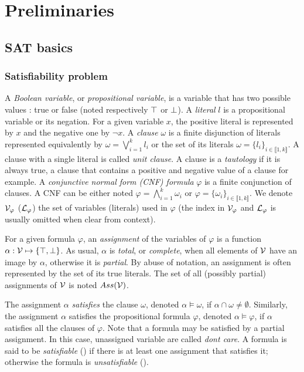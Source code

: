 \chapter{Preliminaries}\label{chap:preliminaries}

\section{SAT basics}

\subsection{Satisfiability problem}
A \emph{Boolean variable}, or \emph{propositional variable}, is a variable that
has two possible values : true or false (noted respectively $\top$ or $\bot$).
A \emph{literal} $l$ is a propositional variable or its
negation. For a given variable $x$, the positive literal is represented by $x$
and the negative one by $\neg x$.
A \emph{clause} $\omega$ is a finite disjunction of literals represented
equivalently by $\omega = \bigvee_{i=1}^k l_i$ or the set of its literals
$\omega = \{l_i\}_{i \in \llbracket 1,k \rrbracket}$. A clause with a single
literal is called \emph{unit clause}.
A clause is a \emph{tautology} if it is always true, a clause that contains a positive 
and negative value of a clause for example.
A \emph{conjunctive normal form (CNF) formula} $\varphi$ is a finite
conjunction of clauses.  A CNF can be either noted $\varphi = \bigwedge_{i=1}^k
\omega_i$ or $\varphi = \{\omega_i\}_{i \in \llbracket 1,k \rrbracket}$. We
denote $\mathcal{V}_\varphi$ ($\mathcal{L}_\varphi$) the set of variables (literals) used in
$\varphi$ (the index in $\mathcal{V}_\varphi$ and $\mathcal{L}_\varphi$ is usually omitted when
clear from context).

For a given formula $\varphi$, an \emph{assignment} of the variables of
$\varphi$ is a function $\alpha: \mathcal{V} \mapsto \{ \top, \bot \}$.  As usual, $\alpha$ is
\emph{total}, or \emph{complete}, when all elements of $\mathcal{V}$ have an image by
$\alpha$, otherwise it is \emph{partial}. By abuse of notation, an assignment is
often represented by the set of its true literals.  The set of all (possibly
partial) assignments of $\mathcal{V}$ is noted $Ass(\mathcal{V})$.

The assignment $\alpha$ \emph{satisfies} the clause $\omega$, denoted $\alpha
\models \omega$, if $\alpha \cap \omega \neq \emptyset$. Similarly, the assignment
$\alpha$ satisfies the propositional formula $\varphi$, denoted $\alpha \models
\varphi$, if $\alpha$ satisfies all the clauses of $\varphi$. Note that a
formula may be satisfied by a partial assignment. In this case, unassigned variable are called
\emph{dont care}.
A formula is said to be
\emph{satisfiable} (\sat) if there is at least one assignment that satisfies it;
otherwise the formula is \emph{unsatisfiable} (\unsat).

